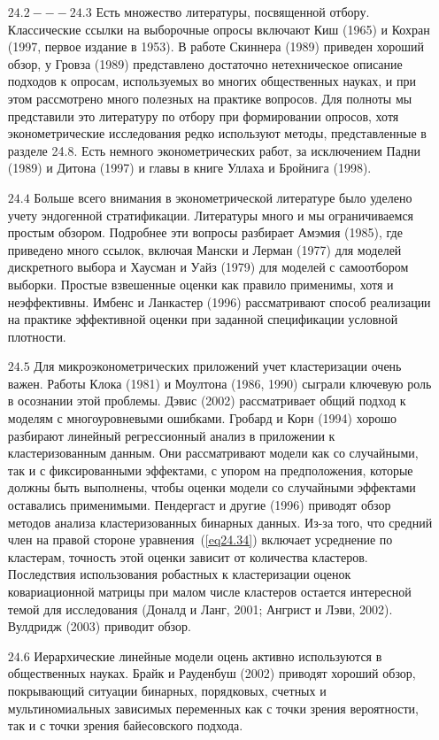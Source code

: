 \begin{enumerate}
\item[$24.2 --- 24.3$] Есть множество литературы, посвященной отбору. Классические ссылки на выборочные опросы включают Киш (1965) и Кохран (1997, первое издание в 1953). В работе Скиннера (1989) приведен хороший обзор, у Гровза (1989) представлено достаточно нетехническое описание подходов к опросам, используемых во многих общественных науках, и при этом рассмотрено много полезных на практике вопросов. Для полноты мы представили это литературу по отбору при формировании опросов, хотя эконометрические исследования редко используют методы, представленные в разделе 24.8. Есть немного эконометрических работ, за исключением Падни (1989) и Дитона (1997) и главы в книге Уллаха и Бройнига (1998). 
\item[$24.4$] Больше всего внимания в эконометрической литературе было уделено учету эндогенной стратификации. Литературы много и мы ограничиваемся простым обзором. Подробнее эти вопросы разбирает Амэмия (1985), где приведено много ссылок, включая Мански и Лерман (1977) для моделей дискретного выбора и Хаусман и Уайз (1979) для моделей с самоотбором выборки. Простые взвешенные оценки как правило применимы, хотя и неэффективны. Имбенс и Ланкастер (1996) рассматривают способ реализации на практике эффективной оценки при заданной спецификации условной плотности. 
\item[$24.5$] Для микроэконометрических приложений учет кластеризации очень важен. Работы Клока (1981) и Моултона (1986, 1990) сыграли ключевую роль в осознании этой проблемы. Дэвис (2002) рассматривает общий подход к моделям с многоуровневыми ошибками. Гробард и Корн (1994) хорошо разбирают линейный регрессионный анализ в приложении к кластеризованным данным. Они рассматривают модели как со случайными, так и с фиксированными эффектами, с упором на предположения, которые должны быть выполнены, чтобы оценки модели со случайными эффектами оставались применимыми. Пендергаст и другие (1996) приводят обзор методов анализа кластеризованных бинарных данных. Из-за того, что средний член на правой стороне уравнения~(\ref{eq24.34}) включает усреднение по кластерам, точность этой оценки зависит от количества кластеров. Последствия использования робастных к кластеризации оценок ковариационной матрицы при малом числе кластеров остается интересной темой для исследования (Доналд и Ланг, 2001; Ангрист и Лэви, 2002). Вулдридж (2003) приводит обзор. 
\item[$24.6$] Иерархические линейные модели оцень активно используются в общественных науках. Брайк и Рауденбуш (2002) приводят хороший обзор, покрывающий ситуации бинарных, порядковых, счетных и мультиномиальных зависимых переменных как с точки зрения вероятности, так и с точки зрения байесовского подхода. 

\end{enumerate}

